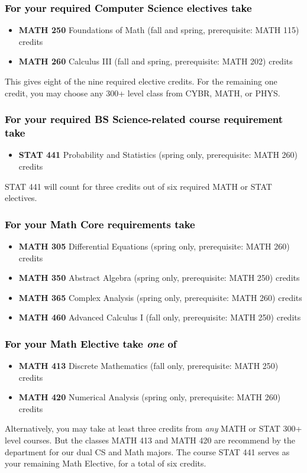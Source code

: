 \documentclass[10pt]{article}
\newenvironment{mypar}[2]
   {\begin{list}{}%
     {\setlength\leftmargin{#1}
     \setlength\rightmargin{#2}}
     \item[]}
   {\end{list}}
\newcommand{\foundations}{\textbf{MATH 250} Foundations of Math (fall and spring, prerequisite: MATH 115)  \dotfill 3 credits}
\newcommand{\calcthree}{\textbf{MATH 260} Calculus III  (fall and spring, prerequisite: MATH 202) \dotfill 5 credits}
\newcommand{\discrete}{\textbf{MATH 413} Discrete Mathematics  (fall only, prerequisite: MATH 250)\dotfill 3 credits}
\newcommand{\statistics}{\textbf{STAT 441} Probability and Statistics (spring only, prerequisite: MATH 260)  \dotfill  3 credits}
\newcommand{\diffeq}{\textbf{MATH 305}	Differential Equations (spring only, prerequisite: MATH 260) \dotfill 	3 credits}
\newcommand{\abstractalgebra}{\textbf{MATH 350}	Abstract Algebra (spring only, prerequisite: MATH 250) \dotfill 	3 credits}
\newcommand{\complex}{\textbf{MATH 365}	Complex Analysis (spring only,  prerequisite: MATH 260) \dotfill 3 credits}
\newcommand{\advancedcalc}{\textbf{MATH 460}	Advanced Calculus I  (fall only,   prerequisite: MATH 250) \dotfill 3 credits}
\newcommand{\numerical}{\textbf{MATH 420}   Numerical Analysis   (spring only, prerequisite: MATH 260)\dotfill 3 credits}
\begin{document}
\subsubsection*{\textcolor{black}{For your required Computer Science electives take}}

\begin{itemize}
\item \foundations
\item  \calcthree
\end{itemize}
\begin{mypar}{0.5cm}{0.5cm} This gives eight of the nine required elective credits. For the remaining one credit, you may choose any 300+ level class from CYBR,  MATH, or PHYS.
\end{mypar}

\subsubsection*{\textcolor{black}{For your required BS Science-related course requirement take}}
\begin{itemize}
\item \statistics
\end{itemize}
\begin{mypar}{0.5cm}{0.5cm} STAT 441 will count for three credits out of six required MATH or STAT electives.
\end{mypar}

\subsubsection*{\textcolor{black}{For your Math Core requirements take}}

\begin{itemize}
  \item \diffeq
  \item \abstractalgebra
  \item \complex
  \item \advancedcalc
\end{itemize}

\subsubsection*{\textcolor{black}{For your  Math Elective take \emph{one} of}}
\begin{itemize}
\item \discrete
\item \numerical
\end{itemize}
\begin{mypar}{0.5cm}{0.5cm}  Alternatively, you may take at least three credits from \emph{any} MATH or STAT 300+ level courses. But the classes MATH 413 and MATH 420 are recommend by the department for our
dual CS and Math majors.  The course STAT 441 serves as your remaining Math Elective, for a total of six credits. \end{mypar}
\end{document}
